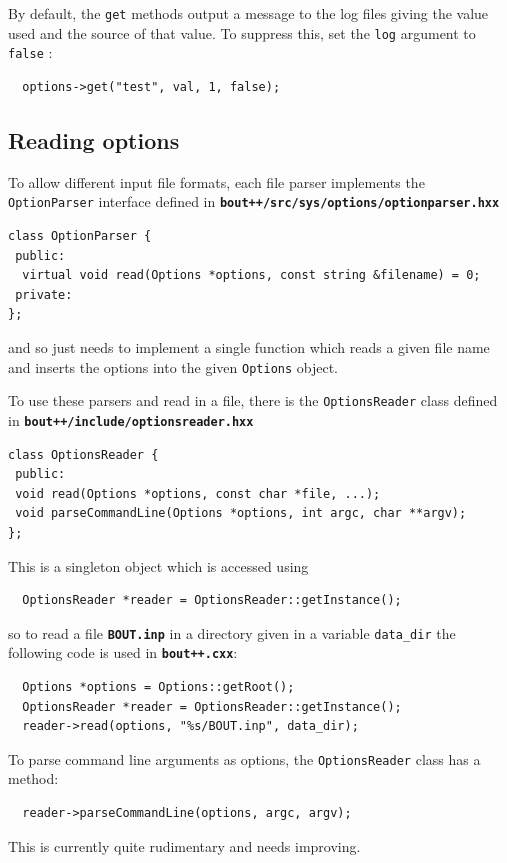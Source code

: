 \documentclass[12pt]{article}
\newcommand{\file}[1]{\texttt{\bf #1}}
\begin{document}
By default, the
%
\lstinline!get!
%
 methods output a message to the log files giving the value used and the source
 of that value.  To suppress this, set the
%
\lstinline!log! argument to \lstinline!false!
%
:
%
\begin{lstlisting}
  options->get("test", val, 1, false);
\end{lstlisting}
%



\subsection{Reading options}
%
To allow different input file formats, each file parser implements the
%
\lstinline!OptionParser!
%
 interface defined in \file{bout++/src/sys/options/optionparser.hxx}
%
%
\begin{lstlisting}
class OptionParser {
 public:
  virtual void read(Options *options, const string &filename) = 0;
 private:
};
\end{lstlisting}
%
and so just needs to implement a single function which reads a given file name
and inserts the options into the given
%
\lstinline!Options!
%
object.

To use these parsers and read in a file, there is the
%
\lstinline!OptionsReader!
%
 class defined in \file{bout++/include/optionsreader.hxx}
%
%
\begin{lstlisting}
class OptionsReader {
 public:
 void read(Options *options, const char *file, ...);
 void parseCommandLine(Options *options, int argc, char **argv);
};
\end{lstlisting}
%
This is a singleton object which is accessed using
%
\begin{lstlisting}
  OptionsReader *reader = OptionsReader::getInstance();
\end{lstlisting}
%
so to read a file \file{BOUT.inp} in a directory given in a variable
%
\lstinline!data_dir!
%
 the following code is used in \file{bout++.cxx}:
%
\begin{lstlisting}
  Options *options = Options::getRoot();
  OptionsReader *reader = OptionsReader::getInstance();
  reader->read(options, "%s/BOUT.inp", data_dir);
\end{lstlisting}
%
To parse command line arguments as options, the
%
\lstinline!OptionsReader!
%
class has a method:
%
\begin{lstlisting}
  reader->parseCommandLine(options, argc, argv);
\end{lstlisting}
%
This is currently quite rudimentary and needs improving.
\end{document}
